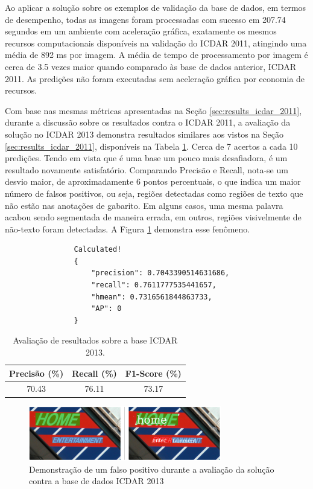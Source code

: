 Ao aplicar a solução sobre os exemplos de validação da base de dados, em termos de desempenho, todas as imagens foram processadas com sucesso em 207.74 segundos em um ambiente com aceleração gráfica, exatamente os mesmos recursos computacionais disponíveis na validação do ICDAR 2011, atingindo uma média de 892 ms por imagem. A média de tempo de processamento por imagem é cerca de 3.5 vezes maior quando comparado às base de dados anterior, ICDAR 2011.  As predições não foram executadas sem aceleração gráfica por economia de recursos.

Com base nas mesmas métricas apresentadas na Seção \ref{sec:results_icdar_2011}, durante a discussão sobre os resultados contra o ICDAR 2011, a avaliação da solução no ICDAR 2013 demonstra resultados similares aos vistos na Seção \ref{sec:results_icdar_2011}, disponíveis na Tabela \ref{tab:icdar13_results}. Cerca de 7 acertos a cada 10 predições. Tendo em vista que é uma base um pouco mais desafiadora, é um resultado novamente satisfatório. Comparando Precisão e Recall, nota-se um desvio maior, de aproximadamente 6 pontos percentuais, o que indica um maior número de falsos positivos, ou seja, regiões detectadas como regiões de texto que não estão nas anotações de gabarito. Em alguns casos, uma mesma palavra acabou sendo segmentada de maneira errada, em outros, regiões visivelmente de não-texto foram detectadas. A Figura \ref{fig:results_icdar13_01} demonstra esse fenômeno.


\begin{verbatim}
                Calculated!
                {
                    "precision": 0.7043390514631686,
                    "recall": 0.7611777535441657,
                    "hmean": 0.7316561844863733, 
                    "AP": 0
                }
\end{verbatim}

\begin{table}[htb]
    \centering
    \caption{Avaliação de resultados sobre a base ICDAR 2013.}
    \begin{tabular}{|c|c|c|}
        \hline
        Precisão (\%) & Recall (\%) & F1-Score (\%) \\
        \hline
        70.43 & 76.11 & 73.17\\
        \hline
    \end{tabular}
    \label{tab:icdar13_results}
\end{table}

\begin{figure}
    \centering
    \includegraphics[width=0.75\textwidth]{figs/resultados-icdar13-01.png}
    \caption{Demonstração de um falso positivo durante a avaliação da solução contra a base de dados ICDAR 2013}
    \label{fig:results_icdar13_01}
\end{figure}

